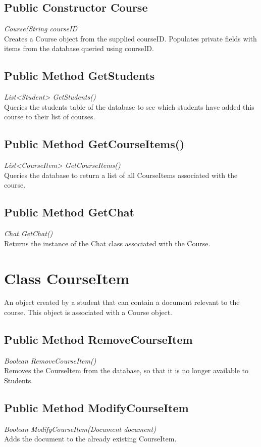 \documentclass{scrreprt}
\begin{document}
\subsection{Public Constructor Course}
\textit{Course(String courseID} \\
Creates a Course object from the supplied courseID. Populates private fields with items from the database queried using courseID.

\subsection{Public Method GetStudents}
\textit{List<Student> GetStudents()} \\
Queries the students table of the database to see which students have added this course to their list of courses.

\subsection{Public Method GetCourseItems()}
\textit{List<CourseItem> GetCourseItems()} \\
Queries the database to return a list of all CourseItems associated with the course.

\subsection{Public Method GetChat}
\textit{Chat GetChat()} \\
Returns the instance of the Chat class associated with the Course.

\section{Class CourseItem}
An object created by a student that can contain a document relevant to the course. This object is associated with a Course object.

\subsection{Public Method RemoveCourseItem}
\textit{Boolean RemoveCourseItem()} \\
Removes the CourseItem from the database, so that it is no longer available to Students.

\subsection{Public Method ModifyCourseItem}
\textit{Boolean ModifyCourseItem(Document document)} \\
Adds the document to the already existing CourseItem.
\end{document}
